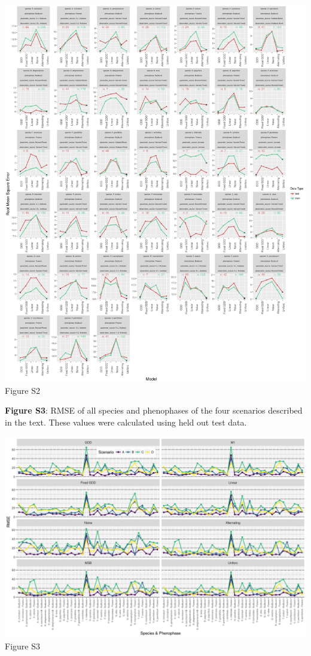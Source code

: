 \documentclass[a4paper,12pt]{article}
\begin{document}
\newpage

\begin{center}
	\centering
		\includegraphics[width=1\textwidth]{supplement_best_lter_models.png}
	Figure S2
\end{center}


\newpage

\textbf{Figure S3}: RMSE of all species and phenophases of the four scenarios described in the text. These values were calculated using held out test data.

\newpage

\begin{center}
	\centering
		\includegraphics[width=1\textwidth]{supplement_scenario_absolute_rmse.png}
	Figure S3
\end{center}
\end{document}
